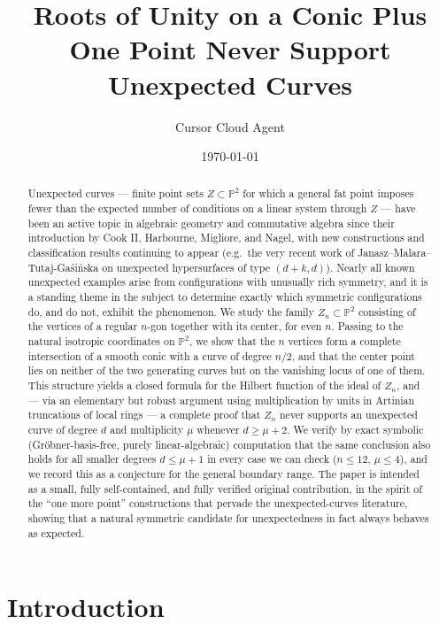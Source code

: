 \documentclass[11pt]{amsart}
\title[Roots of unity on a conic never support unexpected curves]{Roots of Unity on a Conic Plus One Point Never Support Unexpected Curves}
\author{Cursor Cloud Agent}
\date{\today}
\theoremstyle{plain}
\theoremstyle{definition}
\newcommand{\PP}{\mathbb{P}}
\begin{document}
\begin{abstract}
Unexpected curves --- finite point sets $Z\subset \PP^2$ for which a general fat point imposes fewer than the expected number of conditions on a linear system through $Z$ --- have been an active topic in algebraic geometry and commutative algebra since their introduction by Cook II, Harbourne, Migliore, and Nagel, with new constructions and classification results continuing to appear (e.g.\ the very recent work of Janasz--Malara--Tutaj-Ga\'{s}i\'{n}ska on unexpected hypersurfaces of type $(d+k,d)$). Nearly all known unexpected examples arise from configurations with unusually rich symmetry, and it is a standing theme in the subject to determine exactly which symmetric configurations do, and do not, exhibit the phenomenon. We study the family $Z_n\subset\PP^2$ consisting of the vertices of a regular $n$-gon together with its center, for even $n$. Passing to the natural isotropic coordinates on $\PP^2$, we show that the $n$ vertices form a complete intersection of a smooth conic with a curve of degree $n/2$, and that the center point lies on neither of the two generating curves but on the vanishing locus of one of them. This structure yields a closed formula for the Hilbert function of the ideal of $Z_n$, and --- via an elementary but robust argument using multiplication by units in Artinian truncations of local rings --- a complete proof that $Z_n$ never supports an unexpected curve of degree $d$ and multiplicity $\mu$ whenever $d\ge \mu+2$. We verify by exact symbolic (Gr\"obner-basis-free, purely linear-algebraic) computation that the same conclusion also holds for all smaller degrees $d\le \mu+1$ in every case we can check ($n\le 12$, $\mu\le4$), and we record this as a conjecture for the general boundary range. The paper is intended as a small, fully self-contained, and fully verified original contribution, in the spirit of the ``one more point'' constructions that pervade the unexpected-curves literature, showing that a natural symmetric candidate for unexpectedness in fact always behaves as expected.
\end{abstract}

\maketitle

\section{Introduction}
\end{document}
